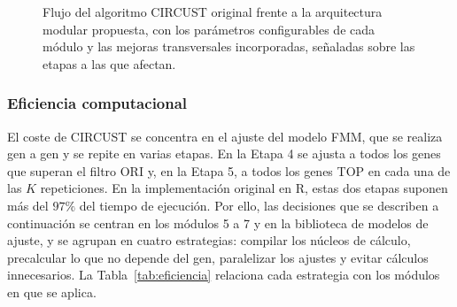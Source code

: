 \documentclass[12pt, a4paper]{report}
\begin{document}
\begin{figure}[p]
\caption[Arquitectura de la reimplementación modular de CIRCUST.]{Flujo del algoritmo CIRCUST original frente a la arquitectura modular propuesta, con los parámetros configurables de cada módulo y las mejoras transversales incorporadas, señaladas sobre las etapas a las que afectan.}
\label{fig:arquitectura}
\end{figure}
\fi

%
%

\subsubsection{Eficiencia computacional}
\label{sec:eficiencia}

El coste de CIRCUST se concentra en el ajuste del modelo FMM, que se realiza gen a gen y se repite en varias etapas. En la Etapa 4 se ajusta a todos los genes que superan el filtro ORI y, en la Etapa 5, a todos los genes TOP en cada una de las \(K\) repeticiones. En la implementación original en R, estas dos etapas suponen más del \(97\%\) del tiempo de ejecución. Por ello, las decisiones que se describen a continuación se centran en los módulos 5 a 7 y en la biblioteca de modelos de ajuste, y se agrupan en cuatro estrategias: compilar los núcleos de cálculo, precalcular lo que no depende del gen, paralelizar los ajustes y evitar cálculos innecesarios. La Tabla~\ref{tab:eficiencia} relaciona cada estrategia con los módulos en que se aplica.
\end{document}
